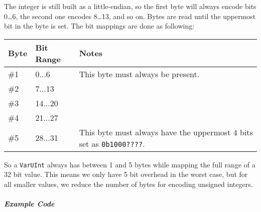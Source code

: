 \documentclass[]{article}
\begin{document}
The integer is still built as a little-endian, so the first byte will
always encode bits 0\ldots6, the second one encodes 8\ldots13, and so
on. Bytes are read until the uppermost bit in the byte is set. The bit
mappings are done as following:

\begin{longtable}[]{@{}p{1in}p{2in}p{3in}@{}}
\toprule
Byte & Bit Range & Notes \\
\midrule
\endhead
\#1 & 0...6 & This byte must always be present. \\
\#2 & 7...13 & \\
\#3 & 14...20 & \\
\#4 & 21...27 & \\
\#5 & 28...31 & This byte must always have the uppermost 4 bits set as
\texttt{0b1000????}. \\
\bottomrule
\end{longtable}

So a \texttt{VarUInt} always has between 1 and 5 bytes while mapping the
full range of a 32 bit value. This means we only have 5 bit overhead in
the worst case, but for all smaller values, we reduce the number of
bytes for encoding unsigned integers.

\hypertarget{example-code}{%
\subparagraph{Example Code}\label{example-code}}
\end{document}
